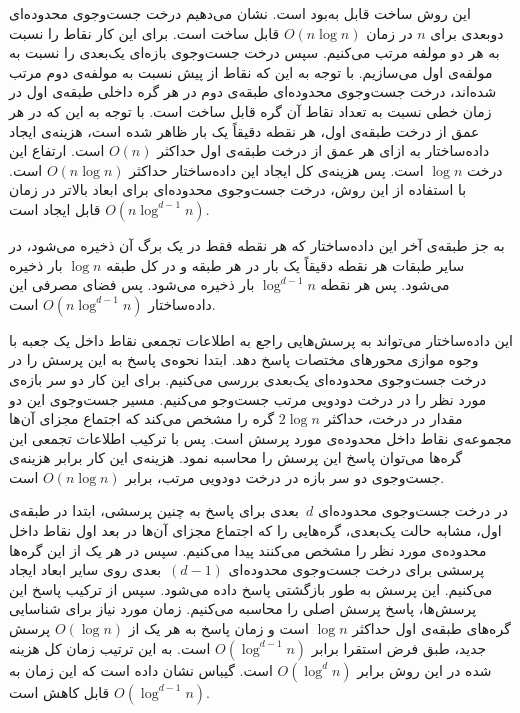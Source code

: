 این روش ساخت قابل به‌بود است. نشان می‌دهیم درخت جست‌وجوی محدوده‌ای دو‌بعدی برای $n$ در زمان $O(n \log n)$ قابل ساخت است. برای این کار نقاط را نسبت به هر دو مولفه مرتب می‌کنیم. سپس درخت جست‌وجوی بازه‌ای یک‌بعدی را نسبت به مولفه‌ی اول می‌سازیم. با توجه به این که نقاط از پیش نسبت به مولفه‌ی دوم مرتب شده‌اند، درخت جست‌وجوی محدوده‌ای طبقه‌ی دوم در هر گره داخلی طبقه‌ی اول در زمان خطی نسبت به تعداد نقاط آن گره قابل ساخت است. با توجه به این که در هر عمق از درخت طبقه‌ی اول، هر نقطه دقیقاً یک بار ظاهر شده است، هزینه‌ی ایجاد داده‌ساختار به ازای هر عمق از درخت طبقه‌ی اول حداکثر $O(n)$ است. ارتفاع این درخت $\log n$ است. پس هزینه‌ی کل ایجاد این داده‌ساختار حداکثر $O(n \log n)$ است. با استفاده از این روش، درخت جست‌وجوی محدوده‌ای برای ابعاد بالاتر در زمان $O(n \log^{d-1} n)$ قابل ایجاد است.

به جز طبقه‌ی آخر این داده‌ساختار که هر نقطه فقط در یک برگ آن ذخیره می‌شود، در سایر طبقات هر نقطه دقیقاً یک بار در هر طبقه و در کل طبقه $\log n$ بار ذخیره می‌شود. پس هر نقطه $\log^{d-1} n$ بار ذخیره می‌شود. پس فضای مصرفی این داده‌ساختار $O(n \log^{d-1} n)$ است.



این داده‌ساختار می‌تواند به پرسش‌هایی راجع به اطلاعات تجمعی نقاط داخل یک جعبه با وجوه موازی محورهای مختصات پاسخ دهد. ابتدا نحوه‌ی پاسخ به این پرسش را در درخت جست‌وجوی محدوده‌ای یک‌بعدی بررسی می‌کنیم. برای این کار دو سر بازه‌ی مورد نظر را در درخت دودویی مرتب جست‌وجو می‌کنیم. مسیر جست‌وجوی این دو مقدار در درخت، حداکثر $2 \log n$ گره را مشخص می‌کند که اجتماع مجزای آن‌ها مجموعه‌ی نقاط داخل محدوده‌ی مورد پرسش است. پس با ترکیب اطلاعات تجمعی این گره‌ها می‌توان پاسخ این پرسش را محاسبه نمود. هزینه‌ی این کار برابر هزینه‌ی جست‌وجوی دو سر بازه در درخت دودویی مرتب، برابر $O(n \log n)$ است.

در درخت جست‌وجوی محدوده‌ای $d$~بعدی برای پاسخ به چنین پرسشی، ابتدا در طبقه‌ی اول، مشابه حالت یک‌بعدی، گره‌هایی را که اجتماع مجزای آن‌ها در بعد اول نقاط داخل محدوده‌ی مورد نظر را مشخص می‌کنند پیدا می‌کنیم. سپس در هر یک از این گره‌ها پرسشی برای درخت جست‌وجوی محدوده‌ای $(d-1)$~بعدی روی سایر ابعاد ایجاد می‌کنیم. این پرسش به طور بازگشتی پاسخ داده می‌شود. سپس از ترکیب پاسخ این پرسش‌ها، پاسخ پرسش اصلی را محاسبه می‌کنیم. زمان مورد نیاز برای شناسایی گره‌های طبقه‌ی اول حداکثر $\log n$ است و زمان پاسخ به هر یک از $O(\log n)$ پرسش جدید، طبق فرض استقرا برابر $O(\log^{d-1} n)$ است. به این ترتیب زمان کل هزینه شده در این روش برابر $O(\log^d n)$ است. گیباس  نشان داده است که این زمان به $O(\log^{d-1} n)$ قابل کاهش است.


